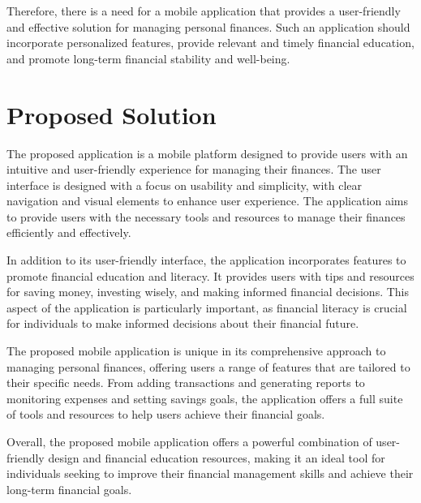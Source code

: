 \hspace{\parindent}Therefore, there is a need for a mobile application that provides a user-friendly and effective solution for managing personal finances. Such an application should incorporate personalized features, provide relevant and timely financial education, and promote long-term financial stability and well-being.
\vspace*{2mm}


\newpage
\section{Proposed Solution}\label{sect:motivation}
\hspace{\parindent} The proposed application is a mobile platform designed to provide users with an intuitive and user-friendly experience for managing their finances. The user interface is designed with a focus on usability and simplicity, with clear navigation and visual elements to enhance user experience. The application aims to provide users with the necessary tools and resources to manage their finances efficiently and effectively.

\hspace{\parindent}In addition to its user-friendly interface, the application incorporates features to promote financial education and literacy. It provides users with tips and resources for saving money, investing wisely, and making informed financial decisions. This aspect of the application is particularly important, as financial literacy is crucial for individuals to make informed decisions about their financial future.

\hspace{\parindent}The proposed mobile application is unique in its comprehensive approach to managing personal finances, offering users a range of features that are tailored to their specific needs. From adding transactions and generating reports to monitoring expenses and setting savings goals, the application offers a full suite of tools and resources to help users achieve their financial goals.

\hspace{\parindent}Overall, the proposed mobile application offers a powerful combination of user-friendly design and financial education resources, making it an ideal tool for individuals seeking to improve their financial management skills and achieve their long-term financial goals.

